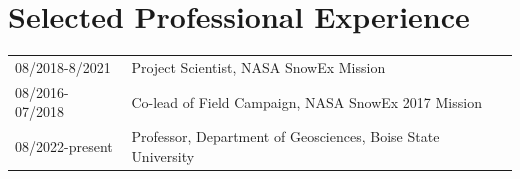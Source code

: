 \documentclass[11pt]{article}
\begin{document}
\section*{Selected Professional Experience}
\begin{tabular}{ll}
08/2018-8/2021 & Project Scientist, NASA SnowEx Mission  \\
08/2016-07/2018 & Co-lead of Field Campaign, NASA SnowEx 2017 Mission \\
08/2022-present & Professor, Department of Geosciences, Boise State University \\
\end{tabular}


\end{document}
